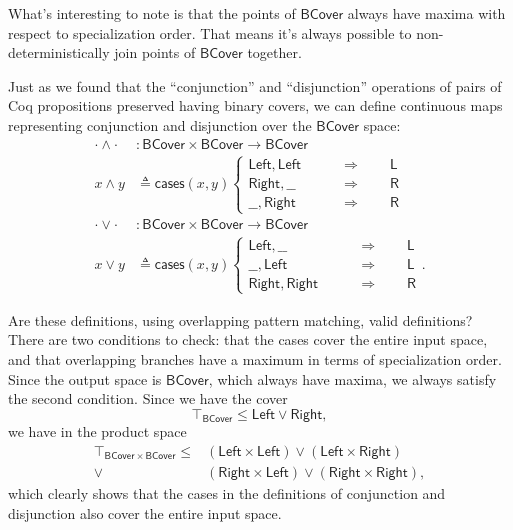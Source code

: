 What's interesting to note is that the points of $\mathsf{BCover}$ always have maxima with respect to specialization order. That means it's always possible to non-deterministically join points of $\mathsf{BCover}$ together.

Just as we found that the ``conjunction'' and ``disjunction'' operations of pairs of Coq propositions preserved having binary covers, we can define continuous maps representing conjunction and disjunction over the $\mathsf{BCover}$ space:
\begin{align*}
\cdot \wedge \cdot &: \mathsf{BCover} \times \mathsf{BCover} \to \mathsf{BCover}
\\ x \wedge y &\triangleq \mathsf{cases}(x, y)
\begin{cases}
\mathsf{Left}, \mathsf{Left}
 \qquad &\Rightarrow \qquad
 \mathsf{L}
\\
\mathsf{Right}, \_\_
 \qquad &\Rightarrow \qquad
 \mathsf{R}
\\
\_\_, \mathsf{Right}
 \qquad &\Rightarrow \qquad
 \mathsf{R}
\end{cases}
\\
\cdot \vee \cdot &: \mathsf{BCover} \times \mathsf{BCover} \to \mathsf{BCover}
\\ x \vee y &\triangleq \mathsf{cases}(x, y)
\begin{cases}
\mathsf{Left}, \_\_
 \qquad &\Rightarrow \qquad
 \mathsf{L}
\\
\_\_, \mathsf{Left}
 \qquad &\Rightarrow \qquad
 \mathsf{L}
\\
 \mathsf{Right}, \mathsf{Right}
 \qquad &\Rightarrow \qquad
 \mathsf{R}
\end{cases}.
\end{align*}

Are these definitions, using overlapping pattern matching, valid definitions? There are two conditions to check: that the cases cover the entire input space, and that overlapping branches have a maximum in terms of specialization order. Since the output space is $\mathsf{BCover}$, which always have maxima, we always satisfy the second condition. Since we have the cover
\[
\top_\mathsf{BCover} \le \mathsf{Left} \vee \mathsf{Right},
\]
we have in the product space
\begin{align*}
\top_{\mathsf{BCover} \times \mathsf{BCover}} \le 
  &(\mathsf{Left} \times \mathsf{Left}) \vee (\mathsf{Left} \times \mathsf{Right})
\\ \vee &(\mathsf{Right} \times \mathsf{Left}) \vee (\mathsf{Right} \times \mathsf{Right}),
\end{align*}
which clearly shows that the cases in the definitions of conjunction and disjunction also cover the entire input space.


